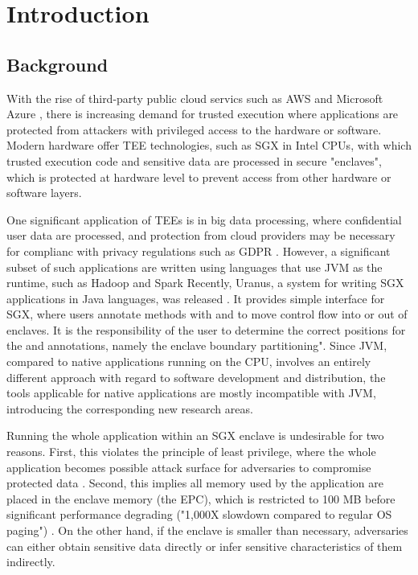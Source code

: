 \section{Introduction}
\subsection{Background}
With the rise of third-party public cloud servics
such as AWS \cite{aws} and Microsoft Azure \cite{azure},
there is increasing demand for trusted execution where
applications are protected from
attackers with privileged access to the hardware or software.
Modern hardware offer TEE technologies,
such as SGX in Intel CPUs,
with which trusted execution code and sensitive data
are processed in secure "enclaves",
which is protected at hardware level to prevent access
from other hardware or software layers.

One significant application of TEEs is in big data processing,
where confidential user data are processed,
and protection from cloud providers may be necessary
for complianc with privacy regulations such as GDPR \cite{gdpr}.
However, a significant subset of such applications are written
using languages that use JVM as the runtime,
such as Hadoop \cite{apachehadoop} and Spark \cite{apachespark}
Recently, Uranus, a system for
writing SGX applications in Java languages, was released \cite{uranus}.
It provides simple interface for SGX,
where users annotate methods with  and 
to move control flow into or out of enclaves.
It is the responsibility of the user to determine the correct positions
for the  and  annotations,
namely the enclave boundary partitioning".
Since JVM, compared to native applications running on the CPU,
involves an entirely different approach
with regard to software development and distribution,
the tools applicable for native applications are mostly incompatible with JVM,
introducing the corresponding new research areas.

Running the whole application within an SGX enclave is undesirable for two reasons.
First, this violates the principle of least privilege,
where the whole application becomes possible attack surface
for adversaries to compromise protected data \cite{glamdring}.
Second, this implies all memory used by the application
are placed in the enclave memory (the EPC),
which is restricted to 100 MB before significant performance degrading
("1,000X slowdown compared to regular OS paging") \cite{uranus}.
On the other hand, if the enclave is smaller than necessary,
adversaries can either obtain sensitive data directly or
infer sensitive characteristics of them indirectly.

